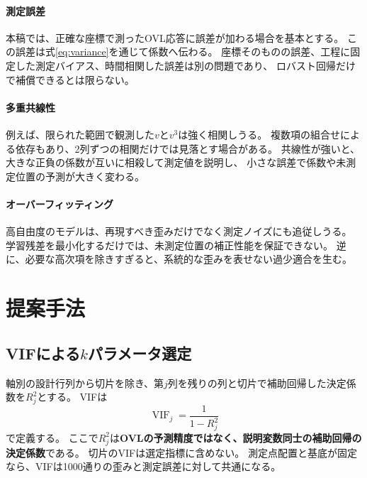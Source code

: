 \documentclass[11pt,a4paper]{ltjsarticle}
\newcommand{\VIF}{\operatorname{VIF}}
\begin{document}
\paragraph{測定誤差}
本稿では、正確な座標で測ったOVL応答に誤差が加わる場合を基本とする。
この誤差は式\eqref{eq:variance}を通じて係数へ伝わる。
座標そのものの誤差、工程に固定した測定バイアス、時間相関した誤差は別の問題であり、
ロバスト回帰だけで補償できるとは限らない。

\paragraph{多重共線性}
例えば、限られた範囲で観測した$v$と$v^3$は強く相関しうる。
複数項の組合せによる依存もあり、2列ずつの相関だけでは見落とす場合がある。
共線性が強いと、大きな正負の係数が互いに相殺して測定値を説明し、
小さな誤差で係数や未測定位置の予測が大きく変わる。

\paragraph{オーバーフィッティング}
高自由度のモデルは、再現すべき歪みだけでなく測定ノイズにも追従しうる。
学習残差を最小化するだけでは、未測定位置の補正性能を保証できない。
逆に、必要な高次項を除きすぎると、系統的な歪みを表せない過少適合を生む。

\section{提案手法}
\subsection{VIFによる\texorpdfstring{$k$}{k}パラメータ選定}
軸別の設計行列から切片を除き、第$j$列を残りの列と切片で補助回帰した決定係数を$R_j^2$とする。
VIFは
\begin{equation}
 \VIF_j=\frac{1}{1-R_j^2}
 \label{eq:vif}
\end{equation}
で定義する\cite{nistvif}。
ここで$R_j^2$は\textbf{OVLの予測精度ではなく、説明変数同士の補助回帰の決定係数}である。
切片のVIFは選定指標に含めない。
測定点配置と基底が固定なら、VIFは1000通りの歪みと測定誤差に対して共通になる。
\end{document}
